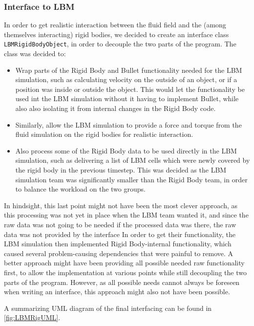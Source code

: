 \subsubsection{Interface to LBM}
In order to get realistic interaction between the fluid field and the (among themselves interacting) rigid bodies, we decided to create an interface class \texttt{LBMRigidBodyObject}, in order to decouple the two parts of the program. The class was decided to:
\begin{itemize}
\item Wrap parts of the Rigid Body and Bullet functionality needed for the LBM simulation, such as calculating velocity on the outside of an object, or if a position was inside or outside the object. This would let the functionality be used int the LBM simulation without it having to implement Bullet, while also also isolating it from internal changes in the Rigid Body code.
\item Similarly, allow the LBM simulation to provide a force and torque from the fluid simulation on the rigid bodies for realistic interaction.
\item Also process some of the Rigid Body data to be used directly in the LBM simulation, such as delivering a list of LBM cells which were newly covered by the rigid body in the previous timestep. This was decided as the LBM simulation team was significantly smaller than the Rigid Body team, in order to balance the workload on the two groups.
\end{itemize}
In hindsight, this last point might not have been the most clever approach, as this processing was not yet in place when the LBM team wanted it, and since the raw data was not going to be needed if the processed data was there, the raw data was not provided by the interface In order to get their functionality, the LBM simulation then implemented Rigid Body-internal functionality, which caused several problem-causing dependencies that were painful to remove. A better approach might have been providing all possible needed raw functionality first, to allow the implementation at various points while still decoupling the two parts of the program. However, as all possible needs cannot always be foreseen when writing an interface, this approach might also not have been possible.

A summarizing UML diagram of the final interfacing can be found in \autoref{fig:LBMRigUML}.

